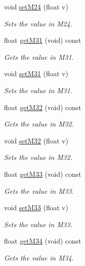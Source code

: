 \begin{DoxyCompactItemize}
void \hyperlink{class_matrix4_acd26d19f01923755bcb2f098c4e3448e}{set\-M24} (float v)
\begin{DoxyCompactList}\small\item\em \-Sets the value in \-M24. \end{DoxyCompactList}\item 
float \hyperlink{class_matrix4_a5c0e3c1489679ab3a0f22c07ebd01256}{get\-M31} (void) const 
\begin{DoxyCompactList}\small\item\em \-Gets the value in \-M31. \end{DoxyCompactList}\item 
void \hyperlink{class_matrix4_a996fcc1a6a015d8b614b647c73cefe4a}{set\-M31} (float v)
\begin{DoxyCompactList}\small\item\em \-Sets the value in \-M31. \end{DoxyCompactList}\item 
float \hyperlink{class_matrix4_a2d102cb2dd0c6f544471015679e7e2b3}{get\-M32} (void) const 
\begin{DoxyCompactList}\small\item\em \-Gets the value in \-M32. \end{DoxyCompactList}\item 
void \hyperlink{class_matrix4_a7c3108bf41067a462becb7a16d2e0d8c}{set\-M32} (float v)
\begin{DoxyCompactList}\small\item\em \-Sets the value in \-M32. \end{DoxyCompactList}\item 
float \hyperlink{class_matrix4_a209b0717ea0284b0351518446655751c}{get\-M33} (void) const 
\begin{DoxyCompactList}\small\item\em \-Gets the value in \-M33. \end{DoxyCompactList}\item 
void \hyperlink{class_matrix4_a61903c13ce25b32da4691dd800d3cb44}{set\-M33} (float v)
\begin{DoxyCompactList}\small\item\em \-Sets the value in \-M33. \end{DoxyCompactList}\item 
float \hyperlink{class_matrix4_ae291881d344f928ce3beba07cec73a64}{get\-M34} (void) const 
\begin{DoxyCompactList}\small\item\em \-Gets the value in \-M34. \end{DoxyCompactList}\item 

\end{DoxyCompactItemize}
